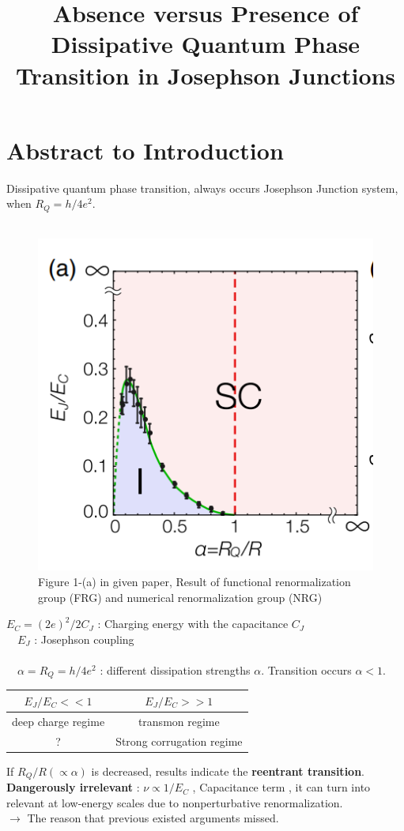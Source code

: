 \documentclass{article}
\title{Absence versus Presence of Dissipative Quantum Phase Transition in Josephson Junctions}
\begin{document}
\section{Abstract to Introduction}
Dissipative quantum phase transition, always occurs Josephson Junction system, when $R_Q=h/4e^2$.\\
 \\

\begin{figure}[!h]
    \centerline{\includegraphics[width=\columnwidth]{Phy129087001_1.png}}
    \caption{Figure 1-(a) in given paper, Result of functional renormalization group (FRG) and numerical renormalization group (NRG)}
    \label{figure_1} 
\end{figure}
$E_C=(2e)^2/2C_J$ : Charging energy with the capacitance $C_J$\\
$\quad E_J$ : Josephson coupling\\
 \\ 
$\quad \alpha = R_Q=h/4e^2$ : different dissipation strengths $\alpha$. Transition occurs $\alpha < 1$.\\
\begin{table}[]
    \begin{tabular}{cc}
    \hline
    \multicolumn{1}{|c|}{$E_J/E_C << 1$}     & \multicolumn{1}{c|}{$E_J/E_C >> 1$}  \\ \hline
    \multicolumn{1}{|c|}{deep charge regime} & \multicolumn{1}{c|}{transmon regime} \\ \hline
    \multicolumn{1}{|c|}{?} & \multicolumn{1}{|c|}{Strong corrugation regime}       \\ \hline
    \end{tabular}
    \end{table}
If $R_Q/R(\propto \alpha) $ is decreased, results indicate the \textbf{reentrant transition}.\\
\textbf{Dangerously irrelevant} : $\nu \propto 1/E_C$ , Capacitance term , it can turn into relevant at low-energy scales due to nonperturbative renormalization.\\
$\rightarrow$ The reason that previous existed arguments missed.
\end{document}
